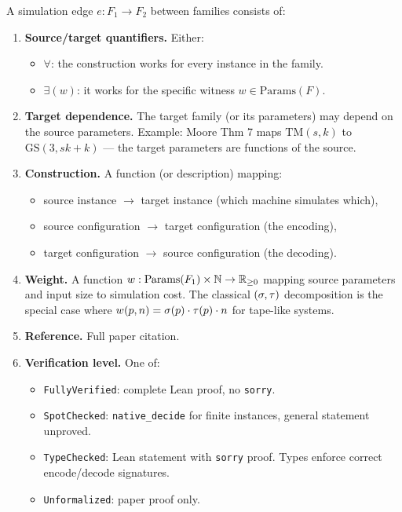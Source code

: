 \begin{definition}\label{sim-edge-def}
A simulation edge $e : F_1 \to F_2$ between families consists of:
\begin{enumerate}
\item \textbf{Source/target quantifiers.} Either:
  \begin{itemize}
  \item $\forall$: the construction works for every instance in the family.
  \item $\exists(w)$: it works for the specific witness $w \in \mathrm{Params}(F)$.
  \end{itemize}
\item \textbf{Target dependence.} The target family (or its parameters) may
  depend on the source parameters. Example: Moore Thm 7 maps $\mathrm{TM}(s,k)$
  to $\mathrm{GS}(3, sk+k)$ --- the target parameters are functions of the source.
\item \textbf{Construction.} A function (or description) mapping:
  \begin{itemize}
  \item source instance $\to$ target instance (which machine simulates which),
  \item source configuration $\to$ target configuration (the encoding),
  \item target configuration $\to$ source configuration (the decoding).
  \end{itemize}
\item \textbf{Weight.} A function $w : \mathrm{Params}(F_1) \times \mathbb{N} \to \mathbb{R}_{\geq 0}$
  mapping source parameters and input size to simulation cost. The classical
  $(\sigma, \tau)$ decomposition is the special case where
  $w(p, n) = \sigma(p) \cdot \tau(p) \cdot n$ for tape-like systems.
\item \textbf{Reference.} Full paper citation.
\item \textbf{Verification level.} One of:
  \begin{itemize}
  \item \texttt{FullyVerified}: complete Lean proof, no \texttt{sorry}.
  \item \texttt{SpotChecked}: \texttt{native\_decide} for finite instances,
    general statement unproved.
  \item \texttt{TypeChecked}: Lean statement with \texttt{sorry} proof.
    Types enforce correct encode/decode signatures.
  \item \texttt{Unformalized}: paper proof only.
  \end{itemize}
\end{enumerate}
\end{definition}

